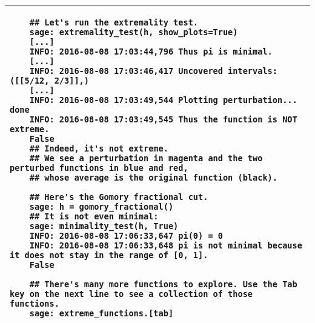 \documentclass[suppldata]{gOMS2e}   %
\begin{document}
\begin{table}
\begin{tabular}{@{}p{\linewidth}@{}}
\begin{verbatim}
	## Let's run the extremality test.
	sage: extremality_test(h, show_plots=True)
	[...]
	INFO: 2016-08-08 17:03:44,796 Thus pi is minimal.
	[...]
	INFO: 2016-08-08 17:03:46,417 Uncovered intervals: ([[5/12, 2/3]],)
	[...]
	INFO: 2016-08-08 17:03:49,544 Plotting perturbation... done
	INFO: 2016-08-08 17:03:49,545 Thus the function is NOT extreme.
	False
	## Indeed, it's not extreme.  
	## We see a perturbation in magenta and the two perturbed functions in blue and red,
	## whose average is the original function (black).
	
	## Here's the Gomory fractional cut.
	sage: h = gomory_fractional()
	## It is not even minimal:
	sage: minimality_test(h, True)
	INFO: 2016-08-08 17:06:33,647 pi(0) = 0
	INFO: 2016-08-08 17:06:33,648 pi is not minimal because it does not stay in the range of [0, 1].
	False
	
	## There's many more functions to explore. Use the Tab key on the next line to see a collection of those functions.
	sage: extreme_functions.[tab]
	\end{verbatim}
    \\
	\bottomrule
  \end{tabular}
\end{table}
\end{document}
